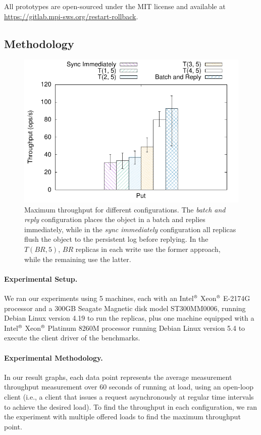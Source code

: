 All prototypes are open-sourced under the MIT license
and available at \url{https://gitlab.mpi-sws.org/restart-rollback}.

\subsection{Methodology}\label{ssec:r2s2methodology}

\begin{figure}[t]
    \centering
    \includegraphics[width=.70\linewidth]{r2s2_results/abd_small/tput.pdf}
    \caption{Maximum throughput for different configurations.
    The \emph{batch and reply} configuration places the
    object in a batch and replies immediately, while in the
    \emph{sync immediately} configuration all replicas
    flush the object to the persistent log before replying. In
    the $T(BR, 5)$, $BR$ replicas in each write use the former
    approach, while the remaining use the
    latter.}\label{fig:r2s2_asym}
\end{figure}
\paragraph{Experimental Setup.}
We ran our experiments using 5 machines, each with an
Intel$^\text{\textregistered}$ Xeon$^\text{\textregistered}$
E-2174G processor and a 300GB Seagate Magnetic disk model
ST300MM0006, running Debian Linux version 4.19 to run the
replicas, plus one machine equipped with a
Intel$^\text{\textregistered}$ Xeon$^\text{\textregistered}$
Platinum 8260M processor running Debian Linux version 5.4 to
execute the client driver of the benchmarks.

\paragraph{Experimental Methodology.} In our result graphs, each data point represents the average
measurement throughput measurement over $60$ seconds of running
at load, using an open-loop client (i.e., a client that issues a
request asynchronously at regular time intervals to achieve the
desired load). To find the throughput in each configuration, we
ran the experiment with multiple offered loads to find the
maximum throughput point.


